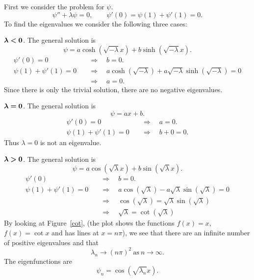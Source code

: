 First we consider the problem for $\psi$.
\[\psi'' + \lambda \psi = 0,\qquad \psi'(0) = \psi(1) + \psi'(1) = 0.\]
To find the eigenvalues we consider the following three cases:
\begin{description}
\item{$\bf \boldsymbol{\lambda} \boldsymbol{<} 0$.}
  The general solution is
  \[ \psi = a \cosh(\sqrt{-\lambda} x) + b \sinh (\sqrt{-\lambda} x). \]
  \begin{align*}
    \psi'(0) = 0 \quad &\Rightarrow \quad b =0. \\
    \psi(1) + \psi'(1) = 0 \quad &\Rightarrow \quad a \cosh (\sqrt{-\lambda}) +
    a \sqrt{-\lambda}\sinh(\sqrt{-\lambda}) = 0 \\
    &\Rightarrow \quad a = 0.
  \end{align*}
  Since there is only the trivial solution, there are no negative eigenvalues.

\item{$\bf \boldsymbol{\lambda} \boldsymbol{=} 0$.}
  The general solution is
  \[ \psi = ax + b.\]
  \begin{align*}
    \psi'(0) = 0 \quad &\Rightarrow \quad a = 0. \\
    \psi(1) + \psi'(1) = 0 \quad &\Rightarrow \quad b + 0 = 0.
  \end{align*}
  Thus $\lambda = 0$ is not an eigenvalue.

\item{$\bf \boldsymbol{\lambda} \boldsymbol{>} 0$.}
  The general solution is
  \[ \psi = a \cos(\sqrt{\lambda}x) + b \sin(\sqrt{\lambda}x).\]
  \begin{align*}
    \psi'(0) \quad &\Rightarrow \quad b = 0. \\
    \psi(1) + \psi'(1) = 0 \quad &\Rightarrow \quad a \cos(\sqrt{\lambda}) -
    a \sqrt{\lambda} \sin(\sqrt{\lambda}) = 0 \\
    &\Rightarrow \quad \cos(\sqrt{\lambda}) =\sqrt{\lambda} \sin(\sqrt{\lambda}) \\
    &\Rightarrow \quad \sqrt{\lambda} = \cot(\sqrt{\lambda})
  \end{align*}
  By looking at Figure~\ref{cot}, (the plot shows the functions
  $f(x) = x$, $f(x) = \cot x$ and has lines at $x=n\pi$), we see
  that there are an infinite number of positive eigenvalues and that
  \[ 
  \lambda_n \to ( n\pi)^2 \ \mathrm{as}\ n \to \infty. 
  \]
  The eigenfunctions are
  \[ \psi_n = \cos(\sqrt{\lambda_n} x). \]
\end{description}

